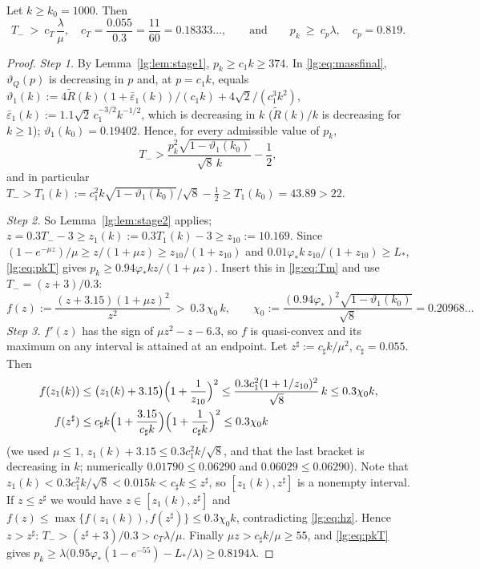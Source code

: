 \begin{lemma}\label{lg:lem:boot}
Let $k\ge k_0=1000$. Then
\[
T_-\ >\ c_T\,\frac{\lambda}{\mu},\quad c_T=\frac{0.055}{0.3}=\frac{11}{60}=0.18333\ldots,\qquad\text{and}\qquad
p_k\ \ge\ c_p\lambda,\quad c_p=0.819 .
\]
\end{lemma}
\begin{proof}
\emph{Step 1.} By Lemma~\ref{lg:lem:stage1}, $p_k\ge c_1k\ge374$. In \eqref{lg:eq:massfinal},
$\vartheta_Q(p)$ is decreasing in $p$ and, at $p=c_1k$, equals
$\vartheta_1(k):=4\tilde R(k)(1+\bar\varepsilon_1(k))/(c_1k)+4\sqrt2/(c_1^3k^2)$,
$\bar\varepsilon_1(k):=1.1\sqrt2\,c_1^{-3/2}k^{-1/2}$, which is decreasing in $k$ ($\tilde R(k)/k$ is
decreasing for $k\ge1$); $\vartheta_1(k_0)=0.19402$. Hence, for every admissible value of $p_k$,
\begin{equation}\label{lg:eq:Tm}
T_->\frac{p_k^2\sqrt{1-\vartheta_1(k_0)}}{\sqrt8\,k}-\frac12 ,
\end{equation}
and in particular $T_->T_1(k):=c_1^2k\sqrt{1-\vartheta_1(k_0)}/\sqrt8-\tfrac12\ge T_1(k_0)=43.89>22$.

\emph{Step 2.} So Lemma~\ref{lg:lem:stage2} applies; $z=0.3T_--3\ge z_1(k):=0.3T_1(k)-3\ge z_{10}:=10.169$.
Since $(1-e^{-\mu z})/\mu\ge z/(1+\mu z)\ge z_{10}/(1+z_{10})$ and
$0.01\varphi_\ast k\,z_{10}/(1+z_{10})\ge L_\ast$, \eqref{lg:eq:pkT} gives
$p_k\ge0.94\varphi_\ast kz/(1+\mu z)$. Insert this in \eqref{lg:eq:Tm} and use $T_-=(z+3)/0.3$:
\begin{equation}\label{lg:eq:hz}
f(z):=\frac{(z+3.15)(1+\mu z)^2}{z^2}\ >\ 0.3\,\chi_0\,k,\qquad
\chi_0:=\frac{(0.94\varphi_\ast)^2\sqrt{1-\vartheta_1(k_0)}}{\sqrt8}=0.20968\ldots
\end{equation}
\emph{Step 3.} $f'(z)$ has the sign of $\mu z^2-z-6.3$, so $f$ is quasi-convex and its maximum on any
interval is attained at an endpoint. Let $z^\sharp:=c_\sharp k/\mu^2$, $c_\sharp=0.055$. Then
\begin{align*}
f(z_1(k))&\le\bigl(z_1(k)+3.15\bigr)\Bigl(1+\frac1{z_{10}}\Bigr)^2
\le\frac{0.3c_1^2(1+1/z_{10})^2}{\sqrt8}\,k\le0.3\chi_0k,\\
f(z^\sharp)&\le c_\sharp k\Bigl(1+\frac{3.15}{c_\sharp k}\Bigr)\Bigl(1+\frac1{c_\sharp k}\Bigr)^2\le0.3\chi_0k
\end{align*}
(we used $\mu\le1$, $z_1(k)+3.15\le0.3c_1^2k/\sqrt8$, and that the last bracket is decreasing in $k$;
numerically $0.01790\le0.06290$ and $0.06029\le0.06290$). Note that
$z_1(k)<0.3c_1^2k/\sqrt8<0.015k<c_\sharp k\le z^\sharp$, so $[z_1(k),z^\sharp]$ is a nonempty interval.
If $z\le z^\sharp$ we would have $z\in[z_1(k),z^\sharp]$ and $f(z)\le\max\{f(z_1(k)),f(z^\sharp)\}\le0.3\chi_0k$,
contradicting \eqref{lg:eq:hz}. Hence $z>z^\sharp$:
$T_->(z^\sharp+3)/0.3>c_T\lambda/\mu$. Finally $\mu z>c_\sharp k/\mu\ge55$, and \eqref{lg:eq:pkT} gives
$p_k\ge\lambda\bigl(0.95\varphi_\ast(1-e^{-55})-L_\ast/\lambda\bigr)\ge0.8194\lambda$.
\end{proof}

